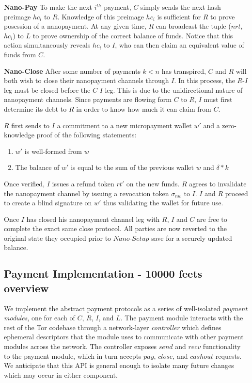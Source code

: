 \textbf{Nano-Pay} To make the next $i^{th}$ payment, $C$ simply sends the next
hash preimage $hc_i$ to $R$. Knowledge of this preimage $hc_i$ is sufficient for
$R$ to prove posession of a nanopayment. At any given time, $R$ can broadcast
the tuple ($nrt$, $hc_i$) to $L$ to prove ownership of the correct balance of
funds. Notice that this action simultaneously reveals $hc_i$ to $I$, who can
then claim an equivalent value of funds from $C$.

\textbf{Nano-Close} After some number of payments $k < n$ has transpired, $C$ and $R$ will both wish
to close their nanopayment channels through $I$. In this process, the $R$-$I$ leg
must be closed before the $C$-$I$ leg. This is due to the unidirectional nature
of nanopayment channels. Since payments are flowing form $C$ to $R$, $I$ must
first determine its debt to $R$ in order to know how much it can claim from $C$.

$R$ first sends to $I$ a commitment to a new micropayment wallet $w'$ and a
zero-knowledge proof of the following statements:

\begin{enumerate}
\item $w'$ is well-formed from $w$
\item The balance of $w'$ is equal to the sum of the previous wallet $w$ and
  $\delta * k$
\end{enumerate}

Once verified, $I$ issues a refund token $rt'$ on the new funds. $R$ agrees to
invalidate the nanopayment channel by issuing a revocation token $\sigma_{nw}$
to $I$. $I$ and $R$ proceed to create a blind signature on $w'$ thus validating
the wallet for future use.

Once $I$ has closed his nanopayment channel leg with $R$, $I$ and $C$ are free
to complete the exact same close protocol. All parties are now reverted to the
original state they occupied prior to $Nano$-$Setup$ save for a securely updated
balance.

\subsection{Payment Implementation - 10000 feets overview}

We implement the abstract payment protocols as a series of well-isolated
\emph{payment modules}, one for each of $C$, $R$, $I$, and $L$. The payment
module interacts with the rest of the Tor codebase through a network-layer
\emph{controller} which defines ephemeral descriptors that the module uses to
communicate with other payment modules across the network. The controller
exposes $send$ and $recv$ functionality to the payment module, which in turn
accepts $pay$, $close$, and $cashout$ requests. We anticipate that this API is
general enough to isolate many future changes which may occur in either
component.

